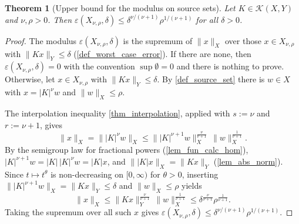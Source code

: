 \documentclass[a4paper]{report}
\theoremstyle{plain}
\newtheorem{theorem}{Theorem}[chapter]
\theoremstyle{definition}
\theoremstyle{remark}
\newcommand{\Kk}{\mathcal{K}}
\begin{document}
\begin{theorem}[Upper bound for the modulus on source sets]
  \label{thm_modulus_source_upper}
  Let $K \in \Kk(X,Y)$ and $\nu, \rho > 0$.  Then
  $\varepsilon(X_{\nu,\rho},\delta) \le \delta^{\nu/(\nu+1)}\rho^{1/(\nu+1)}$ for all
  $\delta > 0$.
\end{theorem}

\begin{proof}
  The modulus $\varepsilon(X_{\nu,\rho},\delta)$ is the supremum of $\|x\|_X$ over those
  $x \in X_{\nu,\rho}$ with $\|Kx\|_Y \le \delta$ (\cref{def_worst_case_error}).  If there
  are none, then $\varepsilon(X_{\nu,\rho},\delta) = 0$ with the convention
  $\sup\emptyset = 0$ and there is nothing to prove.  Otherwise, let
  $x \in X_{\nu,\rho}$ with $\|Kx\|_Y \le \delta$.  By
  \cref{def_source_set} there is $w \in X$ with $x = |K|^{\nu}w$ and $\|w\|_X \le \rho$.

  The interpolation inequality \cref{thm_interpolation}, applied with $s := \nu$ and
  $r := \nu + 1$, gives
  \[
    \|x\|_X = \bigl\||K|^{\nu}w\bigr\|_X
      \le \bigl\||K|^{\nu+1}w\bigr\|_X^{\frac{\nu}{\nu+1}}\,
          \|w\|_X^{\frac{1}{\nu+1}} .
  \]
  By the semigroup law for fractional powers (\cref{lem_fun_calc_hom}),
  $|K|^{\nu+1}w = |K|\,|K|^{\nu}w = |K|x$, and $\||K|x\|_X = \|Kx\|_Y$
  (\cref{lem_abs_norm}).  Since $t \mapsto t^{\theta}$ is non-decreasing on $[0,\infty)$
  for $\theta > 0$, inserting $\||K|^{\nu+1}w\|_X = \|Kx\|_Y \le \delta$ and
  $\|w\|_X \le \rho$ yields
  \[
    \|x\|_X \le \|Kx\|_Y^{\frac{\nu}{\nu+1}}\,\|w\|_X^{\frac{1}{\nu+1}}
      \le \delta^{\frac{\nu}{\nu+1}}\rho^{\frac{1}{\nu+1}} .
  \]
  Taking the supremum over all such $x$ gives
  $\varepsilon(X_{\nu,\rho},\delta) \le \delta^{\nu/(\nu+1)}\rho^{1/(\nu+1)}$.
\end{proof}
\end{document}
